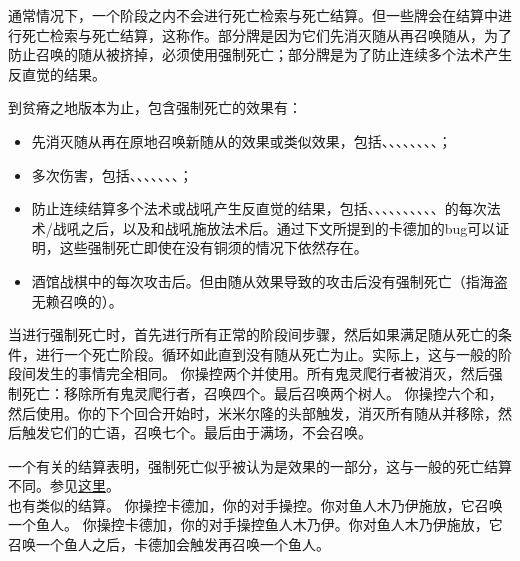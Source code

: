 通常情况下，一个阶段之内不会进行死亡检索与死亡结算。但一些牌会在结算中进行死亡检索与死亡结算，这称作。部分牌是因为它们先消灭随从再召唤随从，为了防止召唤的随从被挤掉，必须使用强制死亡；部分牌是为了防止连续多个法术产生反直觉的结果。

到贫瘠之地版本为止，包含强制死亡的效果有：
\begin{itemize}
    \item 先消灭随从再在原地召唤新随从的效果或类似效果，包括、、、、、、、、；
    \item 多次伤害，包括、、、、、、、；
    \item 防止连续结算多个法术或战吼产生反直觉的结果，包括、、、、、、、、、、的每次法术/战吼之后，以及和战吼施放法术后。通过下文所提到的卡德加的bug可以证明，这些强制死亡即使在没有铜须的情况下依然存在。
    \item 酒馆战棋中的每次攻击后。但由随从效果导致的攻击后没有强制死亡（指海盗无赖召唤的）。
\end{itemize}

当进行强制死亡时，首先进行所有正常的阶段间步骤，然后如果满足随从死亡的条件，进行一个死亡阶段。循环如此直到没有随从死亡为止。实际上，这与一般的阶段间发生的事情完全相同。
\example 你操控两个并使用。所有鬼灵爬行者被消灭，然后强制死亡：移除所有鬼灵爬行者，召唤四个。最后召唤两个树人。
\example 你操控六个和，然后使用。你的下个回合开始时，米米尔隆的头部触发，消灭所有随从并移除，然后触发它们的亡语，召唤七个。最后由于满场，不会召唤。

\notice 一个有关的结算表明，强制死亡似乎被认为是效果的一部分，这与一般的死亡结算不同。参见\href{https://www.bilibili.com/video/av64643539}{这里}。\\
也有类似的结算。
\example 你操控卡德加，你的对手操控。你对鱼人木乃伊施放，它召唤一个鱼人。
\example 你操控卡德加，你的对手操控鱼人木乃伊。你对鱼人木乃伊施放，它召唤一个鱼人之后，卡德加会触发再召唤一个鱼人。

